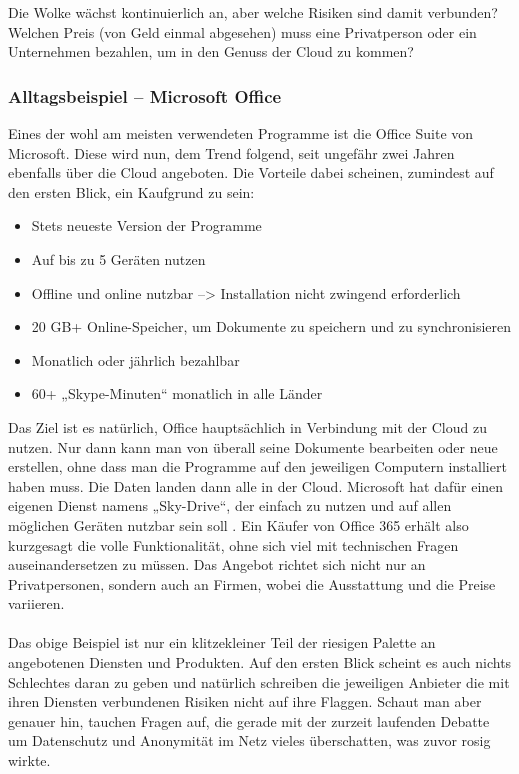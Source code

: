 Die Wolke wächst kontinuierlich an, aber welche Risiken sind damit verbunden? Welchen Preis (von Geld einmal abgesehen) muss eine Privatperson oder ein Unternehmen bezahlen, um in den Genuss der Cloud zu kommen?

\subsubsection{Alltagsbeispiel – Microsoft Office}
Eines der wohl am meisten verwendeten Programme ist die Office Suite von Microsoft. Diese wird nun, dem Trend folgend, seit ungefähr zwei Jahren ebenfalls über die Cloud angeboten. Die Vorteile dabei scheinen, zumindest auf den ersten Blick, ein Kaufgrund zu sein:

\begin{itemize}
\item Stets neueste Version der Programme
\item Auf bis zu 5 Geräten nutzen
\item Offline und online nutzbar --> Installation nicht zwingend erforderlich
\item 20 GB+ Online-Speicher, um Dokumente zu speichern und zu synchronisieren
\item Monatlich oder jährlich bezahlbar
\item 60+ „Skype-Minuten“ monatlich in alle Länder
\end{itemize}

Das Ziel ist es natürlich, Office hauptsächlich in Verbindung mit der Cloud zu nutzen. Nur dann kann man von überall seine Dokumente bearbeiten oder neue erstellen, ohne dass man die Programme auf den jeweiligen Computern installiert haben muss. Die Daten landen dann alle in der Cloud. Microsoft hat dafür einen eigenen Dienst namens „Sky-Drive“, der einfach zu nutzen und auf allen möglichen Geräten nutzbar sein soll . Ein Käufer von Office 365 erhält also kurzgesagt die volle Funktionalität, ohne sich viel mit technischen Fragen auseinandersetzen zu müssen.
Das Angebot richtet sich nicht nur an Privatpersonen, sondern auch an Firmen, wobei die Ausstattung und die Preise variieren.
\\
\\
Das obige Beispiel ist nur ein klitzekleiner Teil der riesigen Palette an angebotenen Diensten und Produkten. Auf den ersten Blick scheint es auch nichts Schlechtes daran zu geben und natürlich schreiben die jeweiligen Anbieter die mit ihren Diensten verbundenen Risiken nicht auf ihre Flaggen. Schaut man aber genauer hin, tauchen Fragen auf, die gerade mit der zurzeit laufenden Debatte um Datenschutz und Anonymität im Netz vieles überschatten, was zuvor rosig wirkte.

